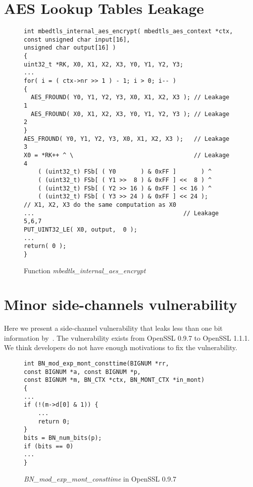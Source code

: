\section{AES Lookup Tables Leakage}
\begin{figure}[h!]
    \centering
    \begin{lstlisting}[xleftmargin=.01\textwidth,xrightmargin=.01\textwidth]
int mbedtls_internal_aes_encrypt( mbedtls_aes_context *ctx,
const unsigned char input[16],
unsigned char output[16] )
{
uint32_t *RK, X0, X1, X2, X3, Y0, Y1, Y2, Y3;
...
for( i = ( ctx->nr >> 1 ) - 1; i > 0; i-- )
{
  AES_FROUND( Y0, Y1, Y2, Y3, X0, X1, X2, X3 ); // Leakage 1
  AES_FROUND( X0, X1, X2, X3, Y0, Y1, Y2, Y3 ); // Leakage 2
}
AES_FROUND( Y0, Y1, Y2, Y3, X0, X1, X2, X3 );   // Leakage 3
X0 = *RK++ ^ \                                  // Leakage 4
    ( (uint32_t) FSb[ ( Y0       ) & 0xFF ]       ) ^
    ( (uint32_t) FSb[ ( Y1 >>  8 ) & 0xFF ] <<  8 ) ^
    ( (uint32_t) FSb[ ( Y2 >> 16 ) & 0xFF ] << 16 ) ^
    ( (uint32_t) FSb[ ( Y3 >> 24 ) & 0xFF ] << 24 );
// X1, X2, X3 do the same computation as X0
...                                          // Leakage 5,6,7
PUT_UINT32_LE( X0, output,  0 );
...
return( 0 );
}
\end{lstlisting}
    \vspace*{-6pt}
    \caption{Function \textit{mbedtls\_internal\_aes\_encrypt}}
    \label{mbedtls_aes}
    \vspace*{-9pt}
\end{figure}

\section{Minor side-channels vulnerability}
\label{appendix:minor:vul}
Here we present a side-channel vulnerability that leaks
less than one bit information by~\tool{}. The vulnerability exists
from OpenSSL 0.9.7 to OpenSSL 1.1.1. We think
developers do not have enough motivations
to fix the vulnerability.

\begin{figure}
\centering
\begin{lstlisting}[xleftmargin=.02\textwidth,xrightmargin=.01\textwidth]
int BN_mod_exp_mont_consttime(BIGNUM *rr, 
const BIGNUM *a, const BIGNUM *p,
const BIGNUM *m, BN_CTX *ctx, BN_MONT_CTX *in_mont)
{
... 
if (!(m->d[0] & 1)) {
    ... 
    return 0;
}
bits = BN_num_bits(p);
if (bits == 0) 
...
}
\end{lstlisting}
    \vspace*{-6pt}
    \caption{\emph{BN\_mod\_exp\_mont\_consttime} in OpenSSL 0.9.7}
    \label{fig:old_sqr2}
    \vspace*{-6pt}
\end{figure}



